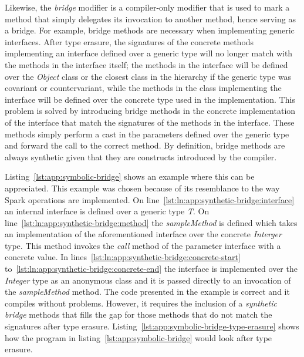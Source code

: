 Likewise, the \textit{bridge} modifier is a compiler-only modifier that is used to mark a method that simply delegates its invocation to another method, hence serving as a bridge. For example, bridge methods are necessary when implementing generic interfaces. After type erasure, the signatures of the concrete methods implementing an interface defined over a generic type will no longer match with the methods in the interface itself; the methods in the interface will be defined over the \textit{Object} class or the closest class in the hierarchy if the generic type was covariant or countervariant, while the methods in the class implementing the interface will be defined over the concrete type used in the implementation. This problem is solved by introducing bridge methods in the concrete implementation of the interface that match the signatures of the methods in the interface. These methods simply perform a cast in the parameters defined over the generic type and forward the call to the correct method. By definition, bridge methods are always synthetic given that they are constructs introduced by the compiler.

Listing~\ref{lst:app:symbolic-bridge} shows an example where this can be appreciated. This example was chosen because of its resemblance to the way Spark operations are implemented. On line~\ref{lst:ln:app:synthetic-bridge:interface} an internal interface is defined over a generic type \textit{T}. On line~\ref{lst:ln:app:synthetic-bridge:method} the \textit{sampleMethod} is defined which takes an implementation of the aforementioned interface over the concrete \textit{Interger} type. This method invokes the \textit{call} method of the parameter interface with a concrete value. In lines~\ref{lst:ln:app:synthetic-bridge:concrete-start} to~\ref{lst:ln:app:synthetic-bridge:concrete-end} the interface is implemented over the \textit{Integer} type as an anonymous class and it is passed directly to an invocation of the \textit{sampleMethod} method. The code presented in the example is correct and it compiles without problems. However, it requires the inclusion of a \textit{synthetic bridge} methods that fills the gap for those methods that do not match the signatures after type erasure. Listing~\ref{lst:app:symbolic-bridge-type-erasure} shows how the program in listing~\ref{lst:app:symbolic-bridge} would look after type erasure. 

